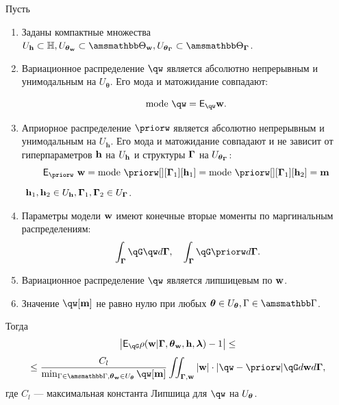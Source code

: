 \begin{lemma}
\label{lem:cp_bound}
Пусть
\begin{enumerate}

\item Заданы компактные множества $\Uh \subset \Hb, \Utetaw \subset \Tetawb, \UtetaG \subset \TetaGb$.

\item Вариационное распределение $\qw$  является абсолютно непрерывным и унимодальным на  $U_{\boldsymbol{\theta}}$.
Его мода и матожидание совпадают:

\[
  \text{mode}~\qw = \E_{\qw} \w.
\]




\item Априорное распределение $\priorw$ является абсолютно непрерывным и унимодальным на  $U_\mathbf{h}$. Его мода и матожидание совпадают и не зависит от гиперпараметров $\mathbf{h}$  на $U_{\mathbf{h}}$ и структуры $\boldsymbol{\Gamma}$ на $U_{\boldsymbol{\theta}_{\boldsymbol{\Gamma}}}$:
\[
\E_{\priorw}~\w = \text{mode}~\priorw[][\G_1][\h_1]=\text{mode}~\priorw[][\G_1][\h_2]=\mathbf{m}
\]
$~\mathbf{h}_1,\mathbf{h}_2 \in U_{\mathbf{h}}, \boldsymbol{\Gamma}_1,\boldsymbol{\Gamma}_2 \in U_{\boldsymbol{\Gamma}}$.


\item Параметры модели $\mathbf{w}$ имеют конечные вторые моменты по маргинальным распределениям:
\[
   \int_{\G}\qG\qw d\G, \quad \int_{\G}\qG\priorw d\G.
\]


\item Вариационное распределение $\qw$ является липшицевым по $\mathbf{w}$.

\item Значение $\qw[\mathbf{m}]$ не равно нулю при любых $\teta \in \Uteta, \Gamma \in \Gb$.
\end{enumerate}
Тогда 
\[
   \left|\E_{\qG} {\rho}(\w|\G, \tetaw, \h, \lam) - 1\right| \leq
\]
\[
\leq \frac{C_l}{\min_{\Gamma \in \Gb, \tetaw \in \Uteta} \qw[\mathbf{m}]} \iint_{\G,\w} |\w| \cdot |\qw - \priorw|\qG d\w d\G,
\]
где $C_l$ --- максимальная константа Липшица для $\qw$ на $U_{\boldsymbol{\theta}}$.

\end{lemma}
